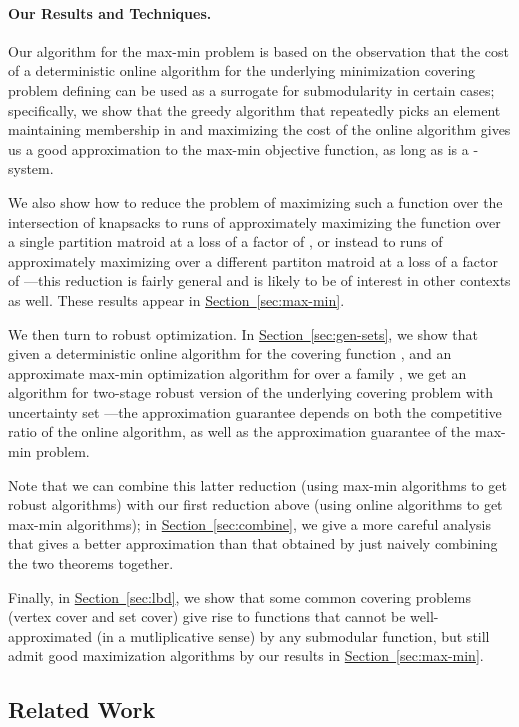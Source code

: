 \documentclass[11pt,letterpaper]{article}
\newcommand{\lref}[2][]{\hyperref[#2]{#1~\ref*{#2}}}
\begin{document}
\paragraph{Our Results and Techniques.} Our algorithm for the max-min
problem is based on the observation that the cost of a deterministic
online algorithm for the underlying minimization covering problem
defining  can be used as a surrogate for submodularity in certain
cases; specifically, we show that the greedy algorithm that repeatedly
picks an element maintaining membership in  and maximizing the cost
of the online algorithm gives us a good approximation to the max-min
objective function, as long as  is a -system.

We also show how to reduce the problem of maximizing such a function
over the intersection of  knapsacks to  runs of
approximately maximizing the function over a single partition matroid at
a loss of a factor of , or instead to
 runs of approximately maximizing over a different
partiton matroid at a loss of a factor of ---this
reduction is fairly general and is likely to be of interest in other
contexts as well. These results appear in \lref[Section]{sec:max-min}.

We then turn to robust optimization. In \lref[Section]{sec:gen-sets}, we
show that given a deterministic online algorithm for the covering
function , and an approximate max-min optimization algorithm for 
over a family , we get an algorithm for two-stage robust version of
the underlying covering problem with uncertainty set ---the
approximation guarantee depends on both the competitive ratio of the
online algorithm, as well as the approximation guarantee of the max-min
problem.

Note that we can combine this latter reduction (using max-min algorithms
to get robust algorithms) with our first reduction above (using online
algorithms to get max-min algorithms); in \lref[Section]{sec:combine}, we
give a more careful analysis that gives a better approximation than that
obtained by just naively combining the two theorems together.

Finally, in \lref[Section]{sec:lbd}, we show that some common covering
problems (vertex cover and set cover) give rise to functions  that
cannot be well-approximated (in a mutliplicative sense) by any
submodular function, but still admit good maximization algorithms by our
results in \lref[Section]{sec:max-min}.

\subsection{Related Work}
\label{sec:related-work}
\end{document}

